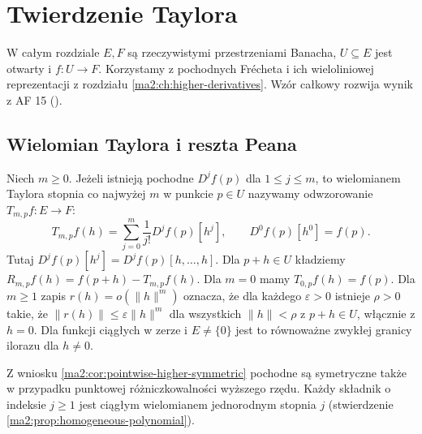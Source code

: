 \chapter{Twierdzenie Taylora}
\label{ma2:ch:taylor}

W całym rozdziale $E,F$ są rzeczywistymi przestrzeniami
Banacha, $U\subseteq E$ jest otwarty i $f:U\to F$.
Korzystamy z pochodnych Frécheta i ich wieloliniowej reprezentacji
z rozdziału \ref{ma2:ch:higher-derivatives}.
Wzór całkowy rozwija wynik z AF 15
().

\section{Wielomian Taylora i reszta Peana}
\begin{definicja}
\label{ma2:def:taylor-polynomial}
Niech $m\ge0$. Jeżeli istnieją pochodne $D^jf(p)$ dla $1\le j\le m$,
to wielomianem Taylora stopnia co najwyżej $m$ w punkcie
$p\in U$ nazywamy odwzorowanie $T_{m,p}f:E\to F$:
\[
 T_{m,p}f(h)=\sum_{j=0}^m\frac{1}{j!}D^jf(p)[h^j],
 \qquad D^0f(p)[h^0]=f(p).
\]
Tutaj $D^jf(p)[h^j]=D^jf(p)[h,\ldots,h]$.
Dla $p+h\in U$ kładziemy
$R_{m,p}f(h)=f(p+h)-T_{m,p}f(h)$.
Dla $m=0$ mamy $T_{0,p}f(h)=f(p)$.
Dla $m\ge1$ zapis $r(h)=o(\|h\|^m)$ oznacza,
że dla każdego $\varepsilon>0$ istnieje $\rho>0$
takie, że $\|r(h)\|\le\varepsilon\|h\|^m$
dla wszystkich $\|h\|<\rho$ z $p+h\in U$,
włącznie z $h=0$. Dla funkcji ciągłych w zerze
i $E\ne\{0\}$ jest to równoważne zwykłej granicy
ilorazu dla $h\ne0$.
\end{definicja}
Z wniosku \ref{ma2:cor:pointwise-higher-symmetric}
pochodne są symetryczne także w przypadku punktowej
różniczkowalności wyższego rzędu. Każdy składnik o indeksie
$j\ge1$ jest ciągłym wielomianem jednorodnym stopnia $j$
(stwierdzenie \ref{ma2:prop:homogeneous-polynomial}).

